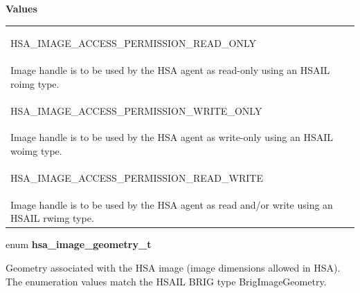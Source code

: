 \documentclass[final]{book}
\newcommand{\reftyp}[1]{#1}
\newcommand{\refenu}[1]{\reftyp{#1}}
\begin{document}
\begin{appendices}
\noindent\textbf{Values}\\[-5mm]
\begin{longtable}{@{\hspace{2em}}p{\linewidth-2em}}
\hspace{-2em}\hypertarget{group--images-1ggab28dbe36c6c4d5186034af5d6cc20deaa9540657358706b3bb55696b0c7432536}{\refenu{HSA_IMAGE_ACCESS_PERMISSION_READ_ONLY}} \\Image handle is to be used by the HSA agent as read-only using an HSAIL roimg type.\\[2mm]
\hspace{-2em}\hypertarget{group--images-1ggab28dbe36c6c4d5186034af5d6cc20deaaa564dea99ae2f523ab1e1e8f4df70e91}{\refenu{HSA_IMAGE_ACCESS_PERMISSION_WRITE_ONLY}} \\Image handle is to be used by the HSA agent as write-only using an HSAIL woimg type.\\[2mm]
\hspace{-2em}\hypertarget{group--images-1ggab28dbe36c6c4d5186034af5d6cc20deaa5d2c08edf4aa6276bc562e5f73ee7f8d}{\refenu{HSA_IMAGE_ACCESS_PERMISSION_READ_WRITE}} \\Image handle is to be used by the HSA agent as read and/or write using an HSAIL rwimg type.
\end{longtable}

\noindent\begin{tcolorbox}[nobeforeafter,arc=0mm,colframe=white,colback=lightgray,left=0mm]
enum \hypertarget{group--images-1ga31e40ddc0666f01a0821a9bc37ca514b}{\textbf{hsa_image_geometry_t}}
\end{tcolorbox}
Geometry associated with the HSA image (image dimensions allowed in HSA). The enumeration values match the HSAIL BRIG type BrigImageGeometry.


\end{appendices}
\end{document}
